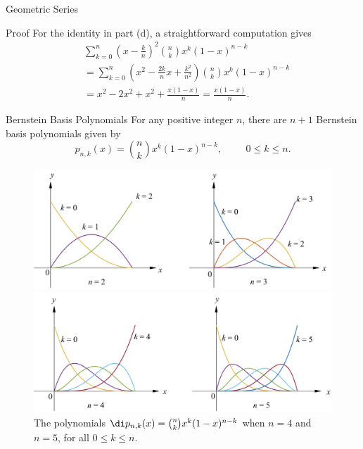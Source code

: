 \begin{example}[label=230305_16]{Geometric Series}
\begin{example}[label=230304_9]{}
\begin{example}{}
\begin{example}{}
\begin{myproof}{Proof}
For the identity in part (d),
  a straightforward computation  gives
\begin{align*}
&\sum_{k=0}^n\left(x-\frac{k}{n}\right)^2\binom{n}{k}x^k(1-x)^{n-k}\\
&= \sum_{k=0}^n\left(x^2- \frac{2k}{n}x+\frac{k^2}{n^2}\right) \binom{n}{k}x^k(1-x)^{n-k}\\
&=x^2-2x^2+x^2+\frac{x(1-x)}{n} =\frac{x(1-x)}{n}.
\end{align*}
\end{myproof}

\begin{definition}{Bernstein Basis Polynomials}
For any positive integer $n$, there are $n+1$ Bernstein basis polynomials given by
\[p_{n,k}(x)=\binom{n}{k}x^k(1-x)^{n-k},\hspace{1cm}0\leq k\leq n.\]
\end{definition}

 \begin{figure}[ht]
\centering
\includegraphics[scale=0.2]{Picture65.png}
\caption{The polynomials $\di p_{n,k}(x)=\binom{n}{k}x^k(1-x)^{n-k}$ when $n=2$ and $n=3$, for all $0\leq k\leq n$.\fa}\label{figure65}
 
\includegraphics[scale=0.2]{Picture66.png}
\caption{The polynomials $\di  p_{n,k}(x)=\binom{n}{k}x^k(1-x)^{n-k}$ when $n=4$ and $n=5$, for all $0\leq k\leq n$.\fa}\label{figure66}
\end{figure}


\end{example}
\end{example}
\end{example}
\end{example}
